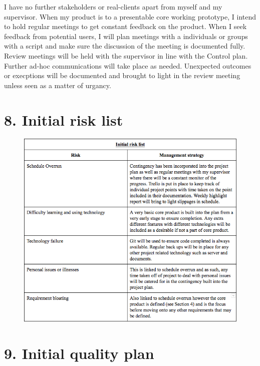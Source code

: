 \documentclass[a4paper]{article}
\begin{document}
I have no further stakeholders or real-clients apart from myself and my supervisor. When my product is to a presentable core working prototype, I intend to hold regular meetings to get constant feedback on the product. When I seek feedback from potential users, I will plan meetings with a individuals or groups with a script and make sure the discussion of the meeting is documented fully. Review meetings will be held with the supervisor in line with the Control plan. Further ad-hoc communications will take place as needed. Unexpected outcomes or execptions will be documented and brought to light in the review meeting unless seen as a matter of urgancy.

\section{8. Initial risk list}

\begin{figure}

    \includegraphics[width=\linewidth]{img/initial-risk-table.png}

\end{figure}

\section{9. Initial quality plan}
\end{document}
